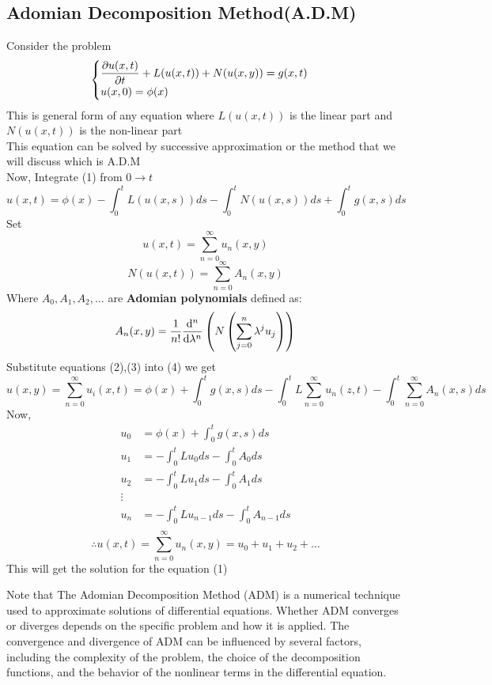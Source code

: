 \documentclass[]{article}
\begin{document}
\subsection {Adomian Decomposition Method(A.D.M)}
Consider the problem
\begin{equation}
    \begin{cases}
        \displaystyle \pdv{u(x,t)}{t} + L(u(x,t)) + N(u(x,y)) = g(x,t)
        \\
        \displaystyle u(x,0) = \phi(x)
    \end{cases}
\end{equation}
This is general form of any equation where $L(u(x,t))$ is the linear part and $N(u(x,t))$ is the non-linear part
\\
This equation can be solved by successive approximation or the method that we will discuss which is A.D.M
\\
Now, Integrate (1) from $0 \to t$
\begin{equation*}
    u(x,t) = \phi(x) - \int_{0}^{t} L(u(x,s))ds  - \int_{0}^{t} N(u(x,s))ds  + \int_{0}^{t} g(x,s)ds
\end{equation*}
Set
\begin{equation}
    u(x,t) = \sum_{n=0}^{\infty} u_n(x,y)
\end{equation}
\begin{equation}
    N(u(x,t)) = \sum_{n=0}^{\infty} A_n(x,y)
\end{equation}
Where $A_0,A_1,A_2,\dots$ are \textbf{Adomian polynomials} defined as:
\begin{equation}
    A_n(x,y) = \frac{1}{n!} \dv[n]{}{\lambda} \left( N \left( \sum_{j=0}^{n}\lambda^j u_j \right) \right)
\end{equation}
Substitute equations (2),(3) into (4) we get
\begin{equation*}
    u(x,y) = \sum_{n=0}^{\infty}u_i(x,t) = \phi(x) + \int_0^t g(x,s) ds - \int_0^t L \sum_{n=0}^{\infty}u_n(z,t) - \int_0^t \sum_{n=0}^{\infty}A_n(x,s) ds
\end{equation*}
Now,
\begin{align*}
    u_0 & = \phi(x) + \int_0^t g(x,s) ds                 \\
    u_1 & = -\int_0^t Lu_0  ds - \int_0^t A_0 ds         \\
    u_2 & = -\int_0^t Lu_1  ds - \int_0^t A_1 ds         \\
    \vdots                                               \\
    u_n & = -\int_0^t Lu_{n-1}  ds - \int_0^t A_{n-1} ds \\
\end{align*}
\[
    \therefore u(x,t) = \sum_{n=0}^{\infty} u_n(x,y) = u_0 + u_1 + u_2 + \dots
\]
This will get the solution for the equation (1)
\par
Note that The Adomian Decomposition Method (ADM)
is a numerical technique used to approximate solutions
of differential equations.
Whether ADM converges or diverges depends on the
specific problem and how it is applied.
The convergence and divergence of ADM can be
influenced by several factors, including the
complexity of the problem, the choice of the
decomposition functions, and the behavior of
the nonlinear terms in the differential equation.
\end{document}
